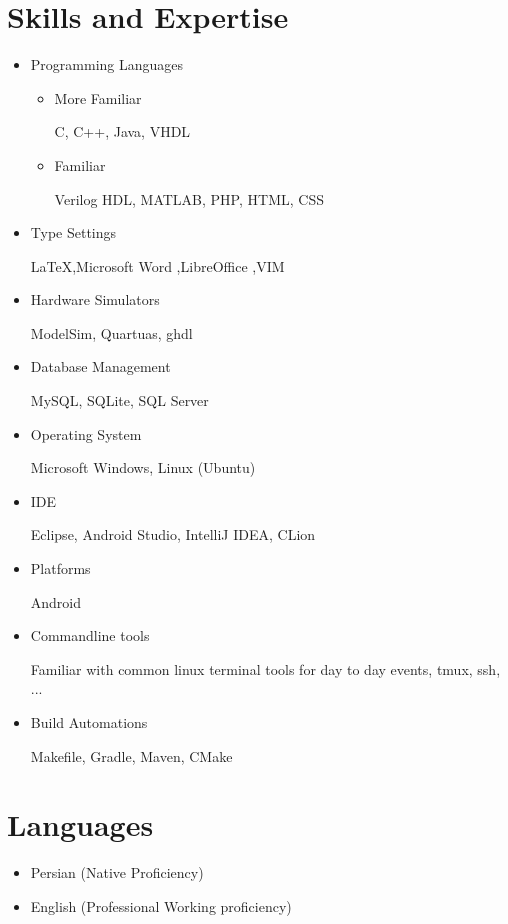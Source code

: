 \documentclass[11pt,a4paper,sans]{moderncv}
\begin{document}
\section{Skills and Expertise}
\begin{itemize}
    \item Programming Languages
        \begin{itemize}
            \item More Familiar

                C, C++, Java, VHDL
            \item Familiar

                Verilog HDL, MATLAB, PHP, HTML, CSS
        \end{itemize}
    \item Type Settings

        \LaTeX ,Microsoft Word ,LibreOffice ,VIM
    \item Hardware Simulators

        ModelSim, Quartuas, ghdl
    \item Database Management

        MySQL, SQLite, SQL Server
    \item Operating System

        Microsoft Windows, Linux (Ubuntu)
    \item IDE

        Eclipse, Android Studio, IntelliJ IDEA, CLion
    \item Platforms

        Android
    \item Commandline tools

        Familiar with common linux terminal tools for day to day events, tmux,
        ssh, ...
    \item Build Automations

        Makefile, Gradle, Maven, CMake
\end{itemize}

\section{ Languages}
\begin{itemize}
    \item Persian (Native Proficiency)
    \item English (Professional Working proficiency)
\end{itemize}
\end{document}
